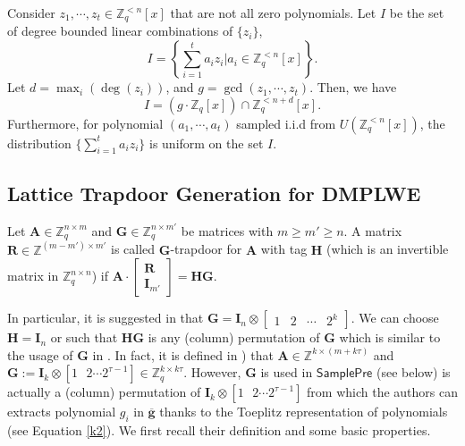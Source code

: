 \documentclass[runningheads]{llncs}
\begin{document}
\begin{lemma}
Consider $z_1,  \cdots, z_t \in \mathbb{Z}_q^{<n}[x]$ that are not all zero polynomials. Let $I$ be the set of degree bounded linear combinations of $\{z_i\}$,
$$I=\left\{\sum_{i=1}^{t}a_iz_i|a_i \in \mathbb{Z}_q^{<n}[x]\right\}.$$
Let $d=\max_i(\deg(z_i))$, and $g=\gcd(z_1,\cdots,z_t)$. Then, we have 
$$I=(g\cdot \mathbb{Z}_q[x]) \cap \mathbb{Z}_q^{<n+d}[x].$$
Furthermore, for polynomial $(a_1,\cdots,a_t)$ sampled i.i.d from $U(\mathbb{Z}_q^{<n}[x])$, the distribution $\{\sum_{i=1}^{t}a_iz_i \}$ is uniform on the set $I$.
\end{lemma}


\fi
\subsection{Lattice Trapdoor Generation for DMPLWE} \label{trapdoor}


\begin{definition} \label{gtrap}
Let $\mathbf{A} \in \mathbb{Z}_q^{n \times m}$ and $\mathbf{G} \in \mathbb{Z}_q^{n \times m'}$ be matrices with $m \geq m' \geq n$. A matrix $\mathbf{R}\in \mathbb{Z}^{(m-m')\times m'}$ is called $\mathbf{G}$-trapdoor for $\mathbf{A}$ with tag $\mathbf{H}$ (which is an invertible matrix in $\mathbb{Z}_q^{n \times n}$) if
 $\mathbf{A}\cdot \begin{bmatrix}
   \mathbf{R}\\ \mathbf{I}_{m'}
 \end{bmatrix}=\mathbf{H}\mathbf{G}.$
\end{definition}


In particular,  it is suggested in \cite[Section 4]{MP12} that $\mathbf{G}=\mathbf{I}_n\otimes \begin{bmatrix}
1& 2&\cdots& 2^{k} 
\end{bmatrix}$. We can choose $\mathbf{H}=\mathbf{I}_n$ or such that $\mathbf{H}\mathbf{G}$ is any (column) permutation of $\mathbf{G}$ which is similar to the usage of $\mathbf{G}$ in \cite{LVV19}. In fact, it is defined in \cite[Definition 11]{LVV19}) that $\mathbf{A} \in \mathbb{Z}^{k \times (m+k\tau)}$ and  $\mathbf{G}:=\mathbf{I}_k \otimes[ 1 \mbox{ } 2 \cdots 2^{\tau-1}] \in \mathbb{Z}_q^{k \times  k\tau}$. However, $\mathbf{G}$ is used in $\mathsf{SamplePre}$ (see below) is actually a (column) permutation of $\mathbf{I}_k \otimes[ 1 \mbox{ } 2 \cdots 2^{\tau-1}] $ from which the authors can extracts polynomial $g_i$ in $\overline{\textbf{g}}$ thanks to the Toeplitz representation of polynomials (see Equation \eqref{k2}). We first recall their definition and some basic properties.
\end{document}

